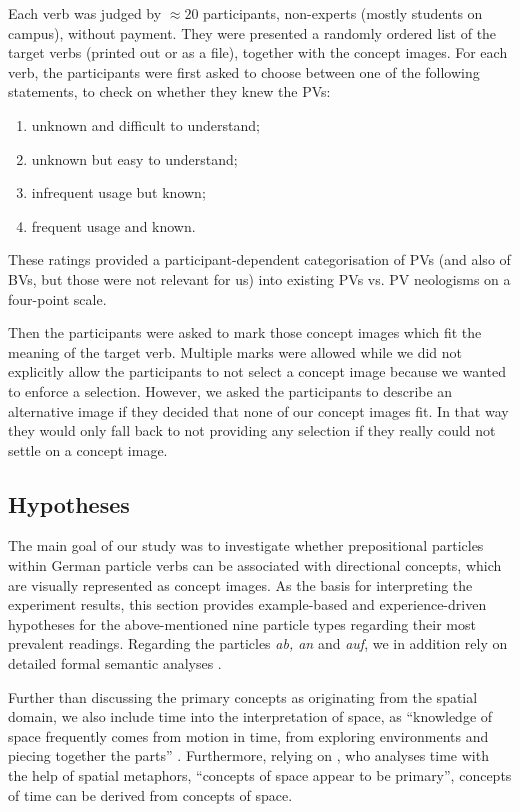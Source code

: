 \documentclass[output=paper]{langsci/langscibook}
\begin{document}
Each verb was judged by ${\approx}20$ participants, non-experts (mostly
students on campus), without payment. They were presented a randomly
ordered list of the target verbs (printed out or as a file), together
with the concept images. For each verb, the participants were first
asked to choose between one of the following statements, to check on
whether they knew the PVs:
\begin{enumerate}
\item unknown and difficult to understand;
\item unknown but easy to understand;
\item infrequent usage but known;
\item frequent usage and known.
\end{enumerate}
These ratings provided a participant-dependent categorisation of PVs
(and also of BVs, but those were not relevant for us) into existing
PVs vs. PV neologisms on a four-point scale.

Then the participants were asked to mark those concept images which
fit the meaning of the target verb. Multiple marks were allowed
while we did not explicitly allow the participants to not select a
concept image because we wanted to enforce a selection. However, we
asked the participants to describe an alternative image if they
decided that none of our concept images fit. In that way they would
only fall back to not providing any selection if they really could not
settle on a concept image.


\subsection{Hypotheses}

The main goal of our study was to investigate whether prepositional
particles within German particle verbs can be associated with
directional concepts, which are visually represented as concept
images. As the basis for interpreting the experiment results, this
section provides example-based and experience-driven hypotheses for
the above-mentioned nine particle types regarding their most prevalent
readings. Regarding the particles \textit{ab, an} and \textit{auf}, we
in addition rely on detailed formal semantic analyses
\citep{Lechler/Rossdeutscher:09ALTER, Kliche:11ALTER,Springorum:11ALTER}.

Further than discussing the primary concepts as originating from the
spatial domain, we also include time into the interpretation of space,
as ``knowledge of space frequently comes from motion in time, from
exploring environments and piecing together the parts''
\citep{Tversky:11}. Furthermore, relying on \cite{Boroditsky:01}, who
analyses time with the help of spatial metaphors, ``concepts of space
appear to be primary'', concepts of time can be derived from concepts
of space.
\end{document}
